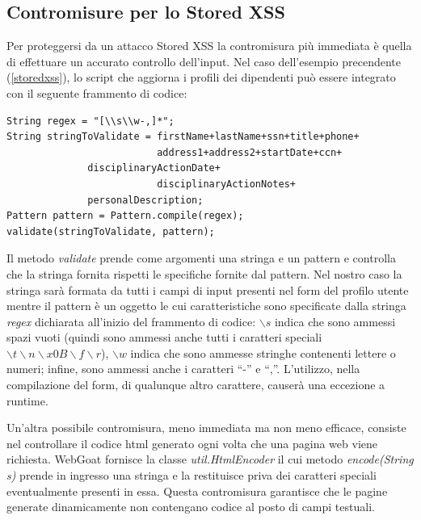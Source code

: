 \documentclass[a4paper,openright,italian]{article}
\begin{document}
\subsection{Contromisure per lo Stored XSS}
Per proteggersi da un attacco Stored XSS la contromisura pi\`u immediata \`e quella di effettuare un accurato controllo dell'input. Nel caso dell'esempio precendente (\ref{storedxss}), lo script che aggiorna i profili dei dipendenti pu\`o essere integrato con il seguente frammento di codice:
\begin{lstlisting}[caption={Codice da integrare per il check dell'input}, label={code:storedxss},frame=trBL]
String regex = "[\\s\\w-,]*";
String stringToValidate = firstName+lastName+ssn+title+phone+
                          address1+address2+startDate+ccn+
			  disciplinaryActionDate+
                          disciplinaryActionNotes+
			  personalDescription;
Pattern pattern = Pattern.compile(regex);
validate(stringToValidate, pattern);
\end{lstlisting}
Il metodo {\it validate} prende come argomenti una stringa e un pattern e controlla che la stringa fornita rispetti le specifiche fornite dal pattern. Nel nostro caso la stringa sar\`a formata da tutti i campi di input presenti nel form del profilo utente mentre il pattern \`e un oggetto le cui caratteristiche sono specificate dalla stringa {\it regex} dichiarata all'inizio del frammento di codice: $\backslash s$ indica che sono ammessi spazi vuoti (quindi sono ammessi anche tutti i caratteri speciali $\backslash t \backslash n \backslash x 0B \backslash f \backslash r$), $\backslash w$ indica che sono ammesse stringhe contenenti lettere o numeri; infine, sono ammessi anche i caratteri ``-'' e ``,''. L'utilizzo, nella compilazione del form, di qualunque altro carattere, causer\`a una eccezione a runtime.

Un'altra possibile contromisura, meno immediata ma non meno efficace, consiste nel controllare il codice html generato ogni volta che una pagina web viene richiesta. WebGoat fornisce la classe {\it util.HtmlEncoder} il cui metodo {\it encode(String s)} prende in ingresso una stringa e la restituisce priva dei caratteri speciali eventualmente presenti in essa. Questa contromisura garantisce che le pagine generate dinamicamente non contengano codice al posto di campi testuali.
\end{document}
